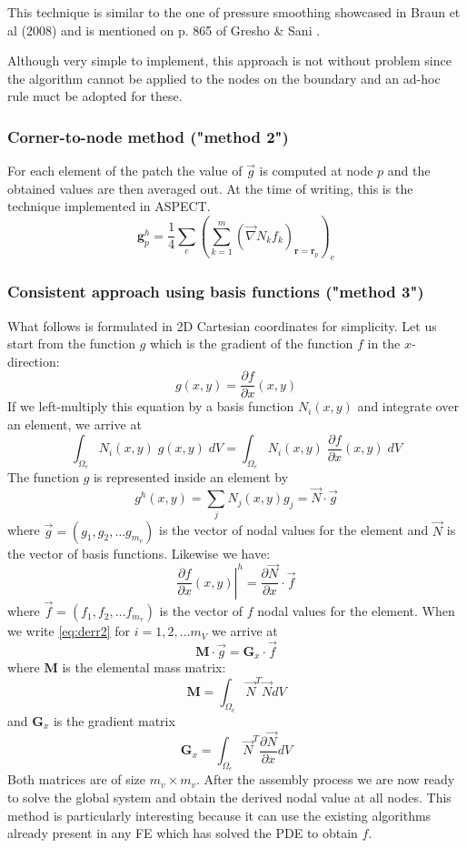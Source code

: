 This technique is similar to the one of pressure smoothing showcased 
in Braun et al (2008) \cite{brtf08}
and is mentioned on p. 865 of Gresho \& Sani \cite{grsa}.

Although very simple to implement, this approach is not without problem since 
the algorithm cannot be applied to the nodes on the boundary and an ad-hoc 
rule muct be adopted for these. 


\subsubsection{Corner-to-node method ("method 2")}

For each element of the patch the value of $\vec g$ is computed at node $p$ and the obtained
values are then averaged out. At the time of writing, this is the technique implemented in  
ASPECT.
\[
\bm g_p^h = \frac{1}{4} \sum_{e} \left( \sum_{k=1}^m  (\vec\nabla N_k f_k)_{\bm r=\bm r_p} \right)_e
\]


\subsubsection{Consistent approach using basis functions ("method 3")}

What follows is formulated in 2D Cartesian coordinates for simplicity. 
Let us start from the function $g$ which is the gradient of the function $f$
in the $x$-direction:
\[
g(x,y) = \frac{\partial f}{\partial x}(x,y)
\]
If we left-multiply this equation by a basis function $N_i(x,y)$ 
and integrate over an element, we arrive at 
\begin{equation}
\int_{\Omega_e} N_i(x,y)\; g(x,y)\; dV =
\int_{\Omega_e} N_i(x,y)\; \frac{\partial f}{\partial x}(x,y)\; dV
\label{eq:derr2}
\end{equation}
The function $g$ is represented inside an element by
\[
g^h(x,y) = \sum_j N_j(x,y) g_j = \vec{N} \cdot \vec{g}
\]
where $\vec{g}=(g_1,g_2,\dots g_{m_v})$ is the vector of nodal values for the element
and $\vec{N}$ is the vector of basis functions.
Likewise we have:
\[
\left. \frac{\partial f}{\partial x}(x,y) \right|^h = \frac{\partial \vec{N}}{\partial x}\cdot \vec{f}
\]
where $\vec{f}=(f_1,f_2,\dots f_{m_v})$ is the vector of $f$ nodal values for the element.
When we write \eqref{eq:derr2} for $i=1,2,...m_V$ we arrive at
\[
{\bm M}\cdot \vec{g} = {\bm G}_x\cdot \vec{f}
\]
where ${\bm M}$ is the elemental mass matrix:
\[
{\bm M}=\int_{\Omega_e} \vec{N}^T \vec{N} dV
\]
and ${\bm G}_x$ is the gradient matrix 
\[
{\bm G}_x=\int_{\Omega_e} \vec{N}^T \frac{\partial \vec{N}}{\partial x} dV
\]
Both matrices are of size $m_v \times m_v$.
After the assembly process we are now ready to solve the global system and obtain
the derived nodal value at all nodes. 
This method is particularly interesting because it can use the existing algorithms 
already present in any FE which has solved the PDE to obtain $f$.  

